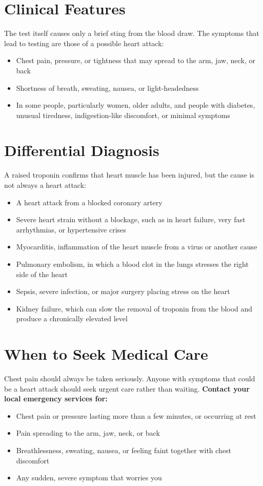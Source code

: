 \section*{Clinical Features}
The test itself causes only a brief sting from the blood draw. The symptoms that lead to testing are those of a possible heart attack:
\begin{itemize}
    \item Chest pain, pressure, or tightness that may spread to the arm, jaw, neck, or back
    \item Shortness of breath, sweating, nausea, or light-headedness
    \item In some people, particularly women, older adults, and people with diabetes, unusual tiredness, indigestion-like discomfort, or minimal symptoms
\end{itemize}

\section*{Differential Diagnosis}
A raised troponin confirms that heart muscle has been injured, but the cause is not always a heart attack:
\begin{itemize}
    \item A heart attack from a blocked coronary artery
    \item Severe heart strain without a blockage, such as in heart failure, very fast arrhythmias, or hypertensive crises
    \item Myocarditis, inflammation of the heart muscle from a virus or another cause
    \item Pulmonary embolism, in which a blood clot in the lungs stresses the right side of the heart
    \item Sepsis, severe infection, or major surgery placing stress on the heart
    \item Kidney failure, which can slow the removal of troponin from the blood and produce a chronically elevated level
\end{itemize}

\section*{When to Seek Medical Care}
Chest pain should always be taken seriously. Anyone with symptoms that could be a heart attack should seek urgent care rather than waiting.
\textbf{Contact your local emergency services for:}
\begin{itemize}
    \item Chest pain or pressure lasting more than a few minutes, or occurring at rest
    \item Pain spreading to the arm, jaw, neck, or back
    \item Breathlessness, sweating, nausea, or feeling faint together with chest discomfort
    \item Any sudden, severe symptom that worries you
\end{itemize}

